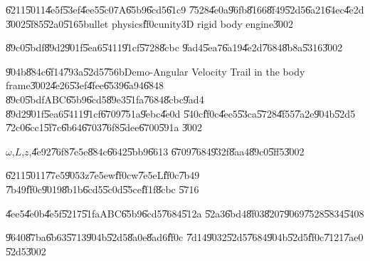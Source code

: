 \clearpage%

\begin{case}
\U{6211}\U{5011}\U{4e5f}\U{53ef}\U{4ee5}\U{5c07}A\U{65b9}\U{6cd5}\U{61c9}%
\U{7528}\U{4e0a}\U{96fb}\U{8166}\U{8f49}\U{52d5}\U{6a21}\U{64ec}\U{4e2d}%
\U{3002}\U{5f85}\U{52a0}\U{5165}bullet physics\U{ff0c}unity3D rigid body
engine\U{3002}
\end{case}

\begin{case}
\U{89c0}\U{5bdf}\U{89d2}\U{901f}\U{5ea6}\U{5411}\U{91cf}\U{5728}\U{8cbc}%
\U{9ad4}\U{5ea7}\U{6a19}\U{4e2d}\U{7684}\U{8b8a}\U{5316}\U{3002}
\end{case}

\U{904b}\U{884c}\U{6f14}\U{793a}\U{52d5}\U{756b}Demo-Angular Velocity Trail
in the body frame\U{3002}\U{4e26}\U{53ef}\U{4fee}\U{6539}\U{6a94}\U{6848}%
\U{89c0}\U{5bdf}ABC\U{65b9}\U{6cd5}\U{89e3}\U{51fa}\U{7684}\U{8cbc}\U{9ad4}%
\U{89d2}\U{901f}\U{5ea6}\U{5411}\U{91cf}\U{6709}\U{751a}\U{9ebc}\U{4e0d}%
\U{540c}\U{ff0c}\U{4ee5}\U{53ca}\U{5728}\U{4f55}\U{7a2e}\U{904b}\U{52d5}%
\U{72c0}\U{6cc1}\U{5f7c}\U{6b64}\U{6703}\U{76f8}\U{5dee}\U{6700}\U{591a}%
\U{3002}

\bigskip

\begin{case}
$\omega $,$L$,$z$,\U{4e92}\U{76f8}\U{7e5e}\U{884c}\U{6642}\U{5bb9}\U{6613}%
\U{6709}\U{7684}\U{932f}\U{8aa4}\U{89c0}\U{5ff5}\U{3002}
\end{case}

\U{6211}\U{5011}\U{77e5}\U{9053}z\U{7e5e}w\U{ff0c}w\U{7e5e}L\U{ff0c}\U{7b49}%
\U{7b49}\U{ff0c}\U{9019}\U{8b1b}\U{6cd5}\U{5c0d}\U{55ce}\U{ff1f}\U{8cbc}%
\U{5716}

\bigskip

\begin{case}
\U{4ee5}\U{4e0b}\U{4e5f}\U{5217}\U{51fa}ABC\U{65b9}\U{6cd5}\U{7684}\U{512a}%
\U{52a3}\U{6bd4}\U{8f03}\U{8207}\U{9069}\U{7528}\U{5834}\U{5408}
\end{case}

%
\begin{center}

\end{center}%

\begin{case}
\U{9640}\U{87ba}\U{6b63}\U{5713}\U{904b}\U{52d5}\U{8a0e}\U{8ad6}\U{ff0c}%
\U{7d14}\U{9032}\U{52d5}\U{7684}\U{904b}\U{52d5}\U{ff0c}\U{7121}\U{7ae0}%
\U{52d5}\U{3002}
\end{case}

